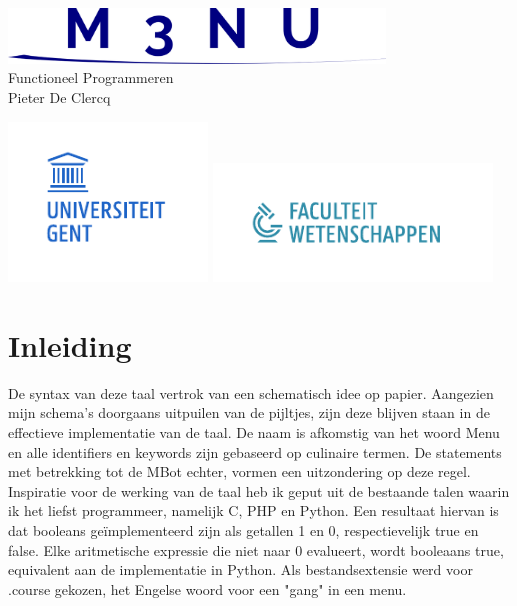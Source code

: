 \documentclass[12pt,a4paper]{report}
\begin{document}

\vspace*{\fill}
\begin{center}
\includegraphics[width=100mm]{verslag/logo.png}
\vspace*{1.5in}\\
  {\Huge Functioneel Programmeren}\\
  {\Large Pieter De Clercq}
\end{center}
\vspace*{\fill}
\begin{center}
\includegraphics[width=53mm]{verslag/logo-ugent.pdf}
\includegraphics[width=74mm]{verslag/logo-we.pdf}
\end{center}
\tableofcontents
\newpage
\chapter{Inleiding}
De syntax van deze taal vertrok van een schematisch idee op papier. Aangezien mijn schema's doorgaans uitpuilen van de pijltjes, zijn deze blijven staan in de effectieve implementatie van de taal. De naam is afkomstig van het woord Menu en alle identifiers en keywords zijn gebaseerd op culinaire termen. De statements met betrekking tot de MBot echter, vormen een uitzondering op deze regel. Inspiratie voor de werking van de taal heb ik geput uit de bestaande talen waarin ik het liefst programmeer, namelijk C, PHP en Python. Een resultaat hiervan is dat booleans geïmplementeerd zijn als getallen 1 en 0, respectievelijk true en false. Elke aritmetische expressie die niet naar 0 evalueert, wordt booleaans true, equivalent aan de implementatie in Python. Als bestandsextensie werd voor .course gekozen, het Engelse woord voor een "gang" in een menu.
\end{document}
